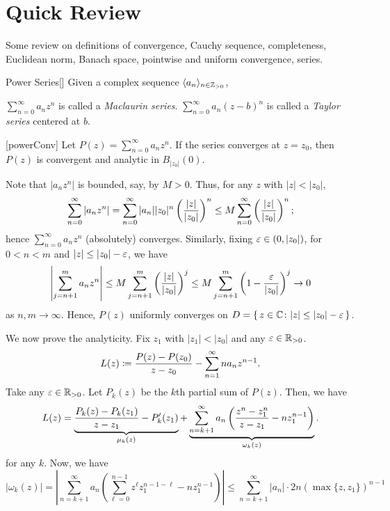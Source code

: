 \documentclass[../complex_variables_1.tex]{subfiles}
\begin{document}
\section{Quick Review}

Some review on definitions of convergence, Cauchy sequence, completeness, Euclidean norm,
Banach space, pointwise and uniform convergence, series.

\begin{Definition}{Power Series}[]
    Given a complex sequence \(\lang a_n \rang_{n \in \ZZ_{>0}}\),
    \begin{enumerate}[label=(\roman*)]
        \ii
        \(\sum_{n=0}^\infty a_n z^n\) is called a \emph{Maclaurin series}.
        \ii
        \(\sum_{n=0}^\infty a_n (z-b)^n\) is called a \emph{Taylor series} centered at \(b\).
    \end{enumerate}
\end{Definition}

\begin{Theorem}{}[powerConv]
    Let \(P(z) = \sum_{n=0}^\infty a_nz^n\).
    If the series converges at \(z = z_0\), then \(P(z)\) is convergent and analytic in \(B_{|z_0|}(0)\).
\end{Theorem}
\begin{myproof}[Proof]
    Note that \(|a_nz^n|\) is bounded, say, by \(M > 0\).
    Thus, for any \(z\) with \(|z| < |z_0|\),
    \[
        \sum_{n=0}^\infty |a_nz^n|
        = \sum_{n=0}^\infty |a_n| |z_0|^n \left( \frac{|z|}{|z_0|} \right)^n
        \le M \sum_{n=0}^\infty \left( \frac{|z|}{|z_0|} \right)^n\text;
    \]
    hence \(\sum_{n=0}^\infty a_nz^n\) (absolutely) converges.
    Similarly, fixing \(\varepsilon \in (0, |z_0|)\), for \(0 < n < m\) and \(|z| \le |z_0| - \varepsilon\), we have
    \[
        \left| \sum_{j=n+1}^m a_nz^n \right|
        \le M \sum_{j=n+1}^m \left( \frac{|z|}{|z_0|} \right)^j
        \le M \sum_{j=n+1}^m \left( 1- \frac{\varepsilon}{|z_0|} \right)^j \to 0
    \]
    as \(n, m \to \infty\). Hence, \(P(z)\) uniformly converges on
    \(D = \{\,z \in \CC \colon |z| \le |z_0| - \veps\,\}\).

    We now prove the analyticity.
    Fix \(z_1\) with \(|z_1| < |z_0|\) and any \(\veps \in \RR_{>0}\).
    \[
        L(z) \coloneqq \frac{P(z)-P(z_0)}{z-z_0} - \sum_{n=1}^\infty na_nz^{n-1}\text.
    \]
    Take any \(\veps \in \RR_{>0}\).
    Let \(P_k(z)\) be the \(k\)th partial sum of \(P(z)\).
    Then, we have
    \[
        L(z) = \underbrace{\frac{P_k(z) - P_k(z_1)}{z - z_1} - P_k'(z_1)}_{\mu_k(z)}
        + \underbrace{\sum_{n=k+1}^\infty a_n \left( \frac{z^n-z_1^n}{z-z_1} - nz_1^{n-1} \right)}_{\omega_k(z)}\text.
    \]
    for any \(k\).
    Now, we have
    \[
        |\omega_k(z)|
        = \left| \sum_{n=k+1}^\infty a_n \left( \sum_{\ell=0}^{n-1}z^{\ell} z_1^{n-1-\ell} - nz_1^{n-1} \right) \right|
        \le \sum_{n=k+1}^\infty |a_n| \cdot 2n(\max \{z, z_1\})^{n-1}
    \]
\end{myproof}
\end{document}
